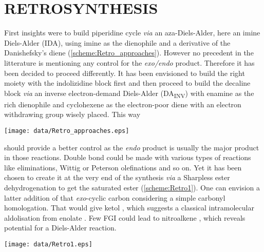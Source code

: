 \section*{RETROSYNTHESIS}
First insights were to build piperidine cycle \textit{via} an aza-Diels-Alder, here an imine Diels-Alder (IDA), using imine  as the dienophile and a derivative of the Danishefsky's diene  (\ref{scheme:Retro_approaches}). However no precedent in the litterature is mentioning any control for the \textit{exo/endo} product. Therefore it has been decided to proceed differently. It has been envisioned to build the right moiety with the indolizidine block first and then proceed to build the decaline block \textit{via} an inverse electron-demand Diels-Alder (DA\textsubscript{INV}) with enamine  as the rich dienophile and cyclohexene  as the electron-poor diene with an electron withdrawing group wisely placed. This way 
\begin{figure''}
\centering
		\texttt{[image: data/Retro\_approaches.eps]}		
    \label{scheme:Retro_approaches}
\end{figure''}
should provide a better control as the \textit{endo} product is usually the major product in those reactions\autocite{Xu17}. Double bond could be made with various types of reactions like eliminations, Wittig or Peterson olefinations and so on. Yet it has been chosen to create it at the very end of the synthesis \textit{via} a Sharpless ester dehydrogenation\autocites{Reich73}{Sharpless73} to get the saturated ester (\ref{scheme:Retro1}). One can envision a latter addition of that \textit{exo}-cyclic carbon considering a simple carbonyl homologation. That would give ketol , which suggests a classical intramolecular aldolisation from enolate . Few FGI could lead to nitroalkene , which reveals potential for a Diels-Alder reaction.
\begin{figure''}
\centering
		\texttt{[image: data/Retro1.eps]}	
    \label{scheme:Retro1}
\end{figure''}
